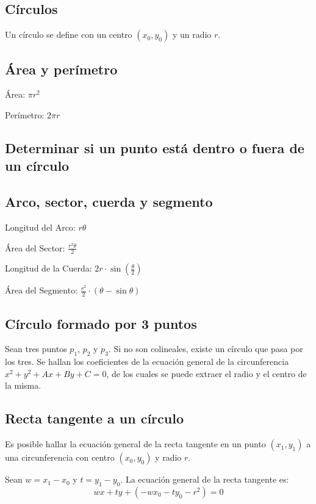 \documentclass{article}
\begin{document}
\begin{multicols}{2}
\section{Círculos}
Un círculo se define con un centro \( (x_0, y_0) \) y un radio \( r \).

\subsection{Área y perímetro}
Área: \( \pi r^2 \)

Perímetro:  \( 2 \pi r \)

\subsection{Determinar si un punto está dentro o fuera de un círculo}


\subsection{Arco, sector, cuerda y segmento}

Longitud del Arco: \( r \theta \)

Área del Sector: \( \frac{r^2 \theta}{2} \)

Longitud de la Cuerda: \( 2 r \cdot \sin (\frac{\theta}{2} ) \)

Área del Segmento: \( \frac{r^2}{2} \cdot ( \theta - \sin \theta ) \)

\subsection{Círculo formado por 3 puntos}
Sean tres puntos  \( p_1 \), \( p_2 \) y  \( p_3 \). Si no son colineales, existe un círculo que pasa por los tres. Se hallan los coeficientes de la ecuación general de la circunferencia \( x^2+y^2+Ax+By+C=0 \), de los cuales se puede extraer el radio y el centro de la misma.


\subsection{Recta tangente a un círculo}
Es posible hallar la ecuación general de la recta tangente en un punto \( (x_1, y_1) \) a una circunferencia con centro \( (x_0, y_0) \) y radio \( r \). 

Sean \( w = x_1-x_0 \) y \( t = y_1-y_0 \). La ecuación general de la recta tangente es:
\[ wx + ty + (-wx_0 - ty_0 - r^2) = 0 \]


\end{multicols}
\end{document}
